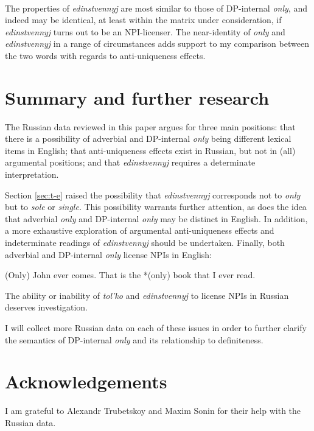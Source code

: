 \documentclass{article}
\begin{document}
\ \\

The properties of \textit{edinstvennyj} are most similar to those of DP-internal \textit{only}, and indeed may be identical, at least within the matrix under consideration, if \textit{edinstvennyj} turns out to be an NPI-licenser. The near-identity of \textit{only} and \textit{edinstvennyj} in a range of circumstances adds support to my comparison between the two words with regards to anti-uniqueness effects.


\section{Summary and further research \label{sec:conclusion}}
The Russian data reviewed in this paper argues for three main positions: that there is a possibility of adverbial and DP-internal \textit{only} being different lexical items in English; that anti-uniqueness effects exist in Russian, but not in (all) argumental positions; and that \textit{edinstvennyj} requires a determinate interpretation.

Section \ref{sec:t-e} raised the possibility that \textit{edinstvennyj} corresponds not to \textit{only} but to \textit{sole} or \textit{single}. This possibility warrants further attention, as does the idea that adverbial \textit{only} and DP-internal \textit{only} may be distinct in English. In addition, a more exhaustive exploration of argumental anti-uniqueness effects and indeterminate readings of \textit{edinstvennyj} should be undertaken. Finally, both adverbial and DP-internal \textit{only} license NPIs in English:

\begin{exe}
	\ex *(Only) John ever comes.
	\ex That is the *(only) book that I ever read.
\end{exe}

The ability or inability of \textit{tol'ko} and \textit{edinstvennyj} to license NPIs in Russian deserves investigation.

I will collect more Russian data on each of these issues in order to further clarify the semantics of DP-internal \textit{only} and its relationship to definiteness.

\section*{Acknowledgements}
I am grateful to Alexandr Trubetskoy and Maxim Sonin for their help with the Russian data.



\end{document}
